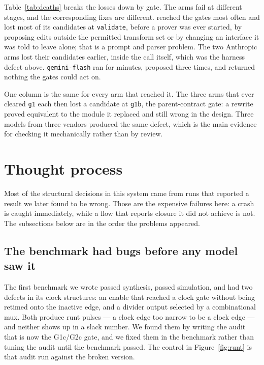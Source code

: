 \documentclass[11pt,a4paper]{article}
\begin{document}


Table~\ref{tab:deaths} breaks the losses down by gate. The arms fail at
different stages, and the corresponding fixes are different. \armcheapname{} reached the gates most often and lost
most of its candidates at \texttt{validate}, before a prover was ever started,
by proposing edits outside the permitted transform set or by changing an
interface it was told to leave alone; that is a prompt and parser problem. The
two Anthropic arms lost their candidates earlier, inside the call itself, which
was the harness defect above. \texttt{gemini-flash} ran for
minutes, proposed three times, and returned nothing the gates could act on.

One column is the same for every arm that reached it. The three arms that ever
cleared \texttt{g1} each then lost a candidate at \texttt{g1b}, the
parent-contract gate: a rewrite proved equivalent to the module it replaced and
still wrong in the design. Three models from three vendors produced the same
defect, which is the main evidence for checking it mechanically rather than by
review.

\section{Thought process}
\label{sec:journey}

Most of the structural decisions in this system came from runs that reported a
result we later found to be wrong. Those are the expensive failures here: a
crash is caught immediately, while a flow that reports closure it did not
achieve is not. The subsections below are in the order the problems appeared.

\subsection{The benchmark had bugs before any model saw it}

The first benchmark we wrote passed synthesis, passed simulation, and had two
defects in its clock structures: an enable that reached a clock gate without
being retimed onto the inactive edge, and a divider output selected by a
combinational mux. Both produce runt pulses --- a clock edge too narrow to be a
clock edge --- and neither shows up in a slack number. We found them by
writing the audit that is now the G1c/G2c gate, and we fixed them in the
benchmark rather than tuning the audit until the benchmark passed. The control
in Figure~\ref{fig:runt} is that audit run against the broken version.
\end{document}
